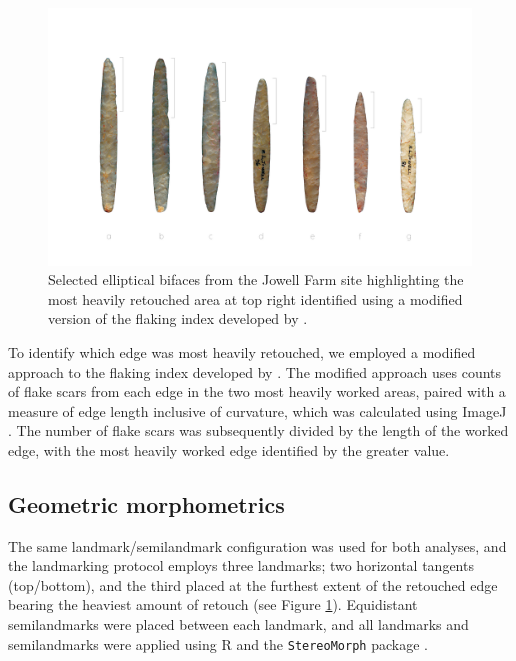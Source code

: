 \documentclass[]{interact}
\theoremstyle{plain}%
\theoremstyle{definition}
\theoremstyle{remark}
\begin{document}
\begin{figure}\centering
\includegraphics[width=\linewidth]{figs/ellipticalbifaces.png}
\caption{Selected elliptical bifaces from the Jowell Farm site highlighting the most heavily retouched area at top right identified using a modified version of the flaking index developed by \citet{RN11099}.}
\label{fig:elliptical}
\end{figure}

To identify which edge was most heavily retouched, we employed a
modified approach to the flaking index developed by \citet{RN11099}. The
modified approach uses counts of flake scars from each edge in the two
most heavily worked areas, paired with a measure of edge length
inclusive of curvature, which was calculated using ImageJ
\citep{RN11146,RN11147,RN11148}. The number of flake scars was
subsequently divided by the length of the worked edge, with the most
heavily worked edge identified by the greater value.

\hypertarget{geometric-morphometrics}{%
\subsection{Geometric morphometrics}\label{geometric-morphometrics}}

The same landmark/semilandmark configuration was used for both analyses,
and the landmarking protocol employs three landmarks; two horizontal
tangents (top/bottom), and the third placed at the furthest extent of
the retouched edge bearing the heaviest amount of retouch (see Figure
\ref{fig:elliptical}). Equidistant semilandmarks were placed between
each landmark, and all landmarks and semilandmarks were applied using R
\citep{R} and the \texttt{StereoMorph} package \citep{RN9091}.
\end{document}
